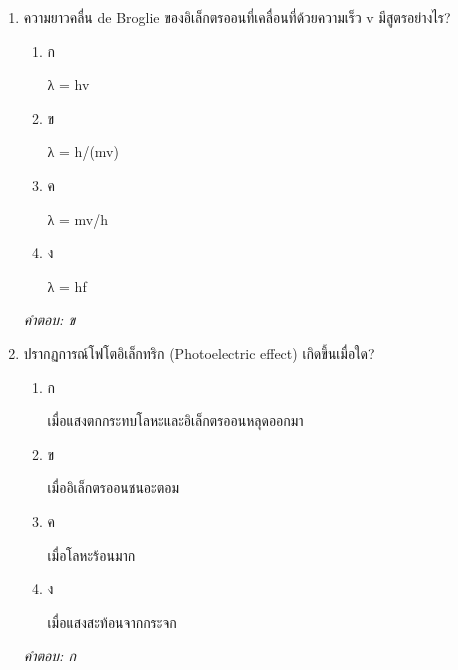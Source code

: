 \documentclass[12pt]{article}
\begin{document}
\begin{enumerate}[label=\arabic*., itemsep=0.5\baselineskip, topsep=0.5\baselineskip, leftmargin=*]
\item ความยาวคลื่น de Broglie ของอิเล็กตรออนที่เคลื่อนที่ด้วยความเร็ว v มีสูตรอย่างไร?
\begin{enumerate}[label=\alph*)., itemsep=0.3\baselineskip, topsep=0.3\baselineskip]
\item ก\ 
\begin{minipage}[t]{0.9\linewidth}
\raggedright λ = hv
\end{minipage}
\item ข\ 
\begin{minipage}[t]{0.9\linewidth}
\raggedright λ = h/(mv)
\end{minipage}
\item ค\ 
\begin{minipage}[t]{0.9\linewidth}
\raggedright λ = mv/h
\end{minipage}
\item ง\ 
\begin{minipage}[t]{0.9\linewidth}
\raggedright λ = hf
\end{minipage}
\end{enumerate}
\vspace{-0.3\baselineskip}
\begin{small}
\textit{คำตอบ: ข}
\end{small}

\item ปรากฏการณ์โฟโตอิเล็กทริก (Photoelectric effect) เกิดขึ้นเมื่อใด?
\begin{enumerate}[label=\alph*)., itemsep=0.3\baselineskip, topsep=0.3\baselineskip]
\item ก\ 
\begin{minipage}[t]{0.9\linewidth}
\raggedright เมื่อแสงตกกระทบโลหะและอิเล็กตรออนหลุดออกมา
\end{minipage}
\item ข\ 
\begin{minipage}[t]{0.9\linewidth}
\raggedright เมื่ออิเล็กตรออนชนอะตอม
\end{minipage}
\item ค\ 
\begin{minipage}[t]{0.9\linewidth}
\raggedright เมื่อโลหะร้อนมาก
\end{minipage}
\item ง\ 
\begin{minipage}[t]{0.9\linewidth}
\raggedright เมื่อแสงสะท้อนจากกระจก
\end{minipage}
\end{enumerate}
\vspace{-0.3\baselineskip}
\begin{small}
\textit{คำตอบ: ก}
\end{small}


\end{enumerate}
\end{document}
